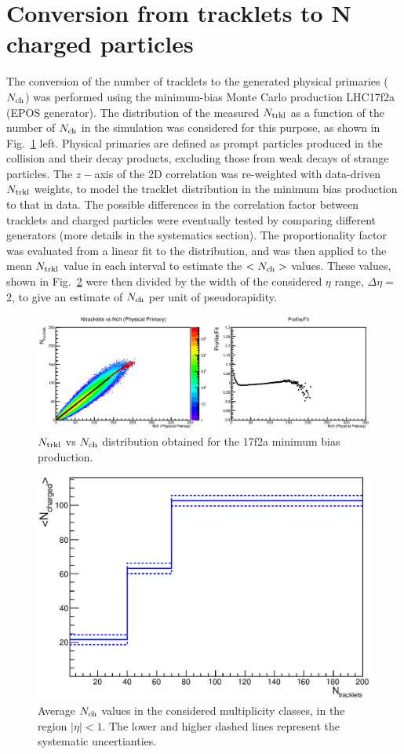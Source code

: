 \section {Conversion from tracklets to N charged particles}
\label{sec:NtrklToNch}
The conversion of the number of tracklets to the generated physical primaries ($N_{\rm ch}$) 
was performed using the minimum-bias Monte Carlo production LHC17f2a (EPOS generator). 
The distribution of the measured $N_{\rm trkl}$ as a function of the number of
$N_{\rm ch}$ in the simulation was considered for this purpose, as shown in Fig.~\ref{fig:NtrklVsNch} left.
Physical primaries are defined as prompt particles produced in the collision and their
decay products, excluding those from weak decays of strange particles. The $z-$axis of
the 2D correlation was re-weighted with data-driven $N_{\rm trkl}$ weights, to model the tracklet
distribution in the minimum bias production to that in data. 
The possible differences in the correlation
factor between tracklets and charged particles were eventually 
tested by comparing different generators (more details
in the systematics section). The proportionality factor was evaluated from a linear fit to the distribution, 
and was then applied to the mean $N_{\rm trkl}$ value in each interval to estimate the $<N_{\rm ch}>$ values. 
These values, shown in Fig.~\ref{fig:Nch} were then divided by the 
width of the considered $\eta$ range, $\Delta \eta =$ 2, 
to give an estimate of $N_{\rm ch}$ per unit of pseudorapidity.

\begin{figure}[h]
\centering
 \includegraphics[width=1.\textwidth]{FigCap6/NtrklVsNchPhysPrimWithNtrklsReweight17f2a.eps}
 \caption{$N_{\rm trkl}$ vs $N_{\rm ch}$ distribution obtained for the 17f2a minimum bias production.}
 \label{fig:NtrklVsNch}
\end{figure}

\begin{figure}[h]
\centering
 \includegraphics[width=.55\textwidth]{FigCap6/AverNchAndTotalSystUnc.eps}
 \caption{Average $N_{\rm ch}$ values in the considered multiplicity classes, in the region $|\eta |< 1$. The lower and higher dashed lines represent the systematic uncertianties.}
 \label{fig:Nch}
\end{figure}


